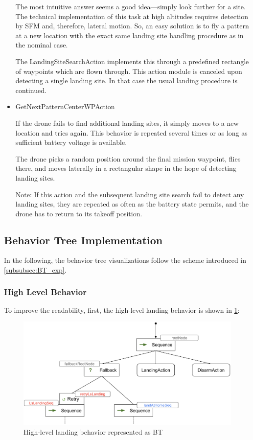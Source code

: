 \begin{itemize}
    The most intuitive answer seems a good idea—simply look further for a site. The technical implementation of this task at high altitudes requires detection by SFM and, therefore, lateral motion. So, an easy solution is to fly a pattern at a new location with the exact same landing site handling procedure as in the nominal case.

    The LandingSiteSearchAction implements this through a predefined rectangle of waypoints which are flown through. This action module is canceled upon detecting a single landing site. In that case the usual landing procedure is continued.
    \item GetNextPatternCenterWPAction

    If the drone fails to find additional landing sites, it simply moves to a new location and tries again. This behavior is repeated several times or as long as sufficient battery voltage is available.

    The drone picks a random position around the final mission waypoint, flies there, and moves laterally in a rectangular shape in the hope of detecting landing sites.

    Note: If this action and the subsequent landing site search fail to detect any landing sites, they are repeated as often as the battery state permits, and the drone has to return to its takeoff position.
    \end{itemize}

\subsection{Behavior Tree Implementation}\label{subsec:behavior_tree}

In the following, the behavior tree visualizations follow the scheme introduced in \cref{subsubsec:BT_exp}.

\subsubsection{High Level Behavior}

To improve the readability, first, the high-level landing behavior is shown in \cref{fig:high_lvl_bt}:

\begin{figure}[h]
\centering
\includegraphics[scale=0.18]{images/autonomous_landing/high_level_BT.png}
\caption{High-level landing behavior represented as BT}
\label{fig:high_lvl_bt}
\end{figure}

